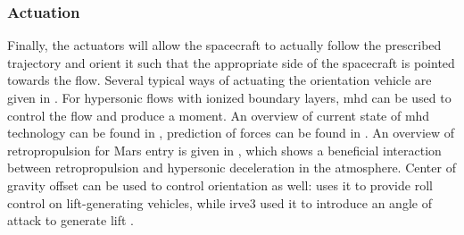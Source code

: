\subsubsection{Actuation}
Finally, the actuators will allow the spacecraft to actually follow the prescribed trajectory and orient it such that the appropriate side of the spacecraft is pointed towards the flow. Several typical ways of actuating the orientation vehicle are given in \cite{Wertz2011}. For hypersonic flows with ionized boundary layers, \gls{mhd} can be used to control the flow and produce a moment. An overview of current state of \gls{mhd} technology can be found in \cite{Braun2009}, prediction of forces can be found in \cite{Kawamura2013}. An overview of retropropulsion for Mars entry is given in \cite{Korzun2009}, which shows a beneficial interaction between retropropulsion and hypersonic deceleration in the atmosphere. Center of gravity offset can be used to control orientation as well: \cite{Petsopoulos1996} uses it to provide roll control on lift-generating vehicles, while \gls{irve3} used it to introduce an angle of attack to generate lift \cite{Dillman2012a}.